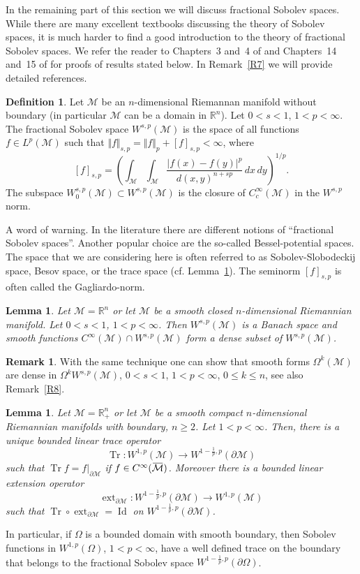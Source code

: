 \documentclass[intlimits,12pt,reqno]{amsart}
\newcommand{\cM}{\mathcal M}
\newcommand{\bbbr}{\mathbb R}
\newcommand{\R}{\mathbb R}
\newcommand{\overbar}[1]{\mkern 1.7mu\overline{\mkern-1.7mu#1\mkern-1.5mu}\mkern 1.5mu}
\numberwithin{equation}{section}
\def\ext{\operatorname{ext}}
\newtheorem{lemma}[theorem]{Lemma}
\theoremstyle{definition}
\newtheorem{remark}[theorem]{Remark}
\newtheorem{definition}[theorem]{Definition}
\begin{document}
In the remaining part of this section we will discuss fractional Sobolev spaces. While there are many excellent textbooks discussing the theory of Sobolev spaces,
it is much harder to find a good introduction to the theory of fractional Sobolev spaces. 
We refer the reader to Chapters~3 and~4 of \cite{demengel} and Chapters~14 and~15 of \cite{leoni} for proofs of results stated below.
In Remark~\ref{R7} we will provide detailed references.
\begin{definition}
Let $\cM$ be an $n$-dimensional Riemannan manifold without boundary (in particular $\cM$ can be a domain in $\bbbr^n$).
Let $0<s<1$, $1<p<\infty$. The fractional Sobolev space $W^{s,p}(\cM)$ is the space of all functions $f\in L^p(\cM)$ such that 
$\Vert f\Vert_{s,p}= \Vert f\Vert_p+[f]_{s,p}<\infty$, where
$$
[f]_{s,p}=\left(\int_{\cM}\int_{\cM}\frac{|f(x)-f(y)|^p}{d(x,y)^{n+sp}}\, dx\, dy\right)^{1/p}.
$$
The subspace $W^{s,p}_0(\cM)\subset W^{s,p}(\cM)$ is the closure of $C_c^\infty(\cM)$ in the $W^{s,p}$ norm.
\end{definition}
A word of warning. In the literature there are different notions of ``fractional Sobolev spaces''. Another popular choice are the so-called Bessel-potential spaces. The space that we are considering here is often referred to as Sobolev-Slobodeckij space, Besov space, or the trace space (cf. Lemma~\ref{T19}). The seminorm $[f]_{s,p}$ is often called the Gagliardo-norm.
\begin{lemma}
\label{T58}
Let $\cM=\R^n$ or let $\cM$ be a smooth closed $n$-dimensional Riemannian manifold. Let $0<s<1$, $1<p<\infty$. Then $W^{s,p}(\cM)$ is a Banach space and smooth functions $C^\infty(\cM)\cap W^{s,p}(\cM)$ form a dense subset of $W^{s,p}(\cM)$.  
\end{lemma}
\begin{remark}
\label{R11}
With the same technique one can show that smooth forms $\Omega^k(\cM)$ are dense in $\Omega^kW^{s,p}(\cM)$, $0<s<1$, $1<p<\infty$, $0\leq k\leq n$, see also Remark~\ref{R8}.
\end{remark}
\begin{lemma}
\label{T19}
Let $\cM=\R^n_+$ or
let $\cM$ be a smooth compact $n$-dimensional Riemannian manifolds with boundary, $n\geq 2$. 
Let $1<p<\infty$.
Then, there is a unique bounded linear trace operator
$$
\operatorname{Tr}:W^{1,p}(\cM)\to W^{1-\frac{1}{p},p}(\partial \cM)
$$
such that $\operatorname{Tr}f=f|_{\partial\cM}$ if $f\in C^\infty(\overbar{\cM})$. 
Moreover there is a bounded linear extension operator
\begin{equation}
\label{eq39}
\ext_{\partial\cM}:W^{1-\frac{1}{p},p}(\partial \cM)\to W^{1,p}(\cM)
\end{equation}
such that $\operatorname{Tr}\circ\ext_{\partial\cM}=\operatorname{Id}$ on $W^{1-\frac{1}{p},p}(\partial \cM)$.
\end{lemma}
In particular, if $\Omega$ is a bounded domain with smooth boundary, then Sobolev functions in $W^{1,p}(\Omega)$, $1<p<\infty$, have a well defined trace on the boundary that belongs to the fractional Sobolev space $W^{1-\frac{1}{p},p}(\partial\Omega)$. 
\end{document}
